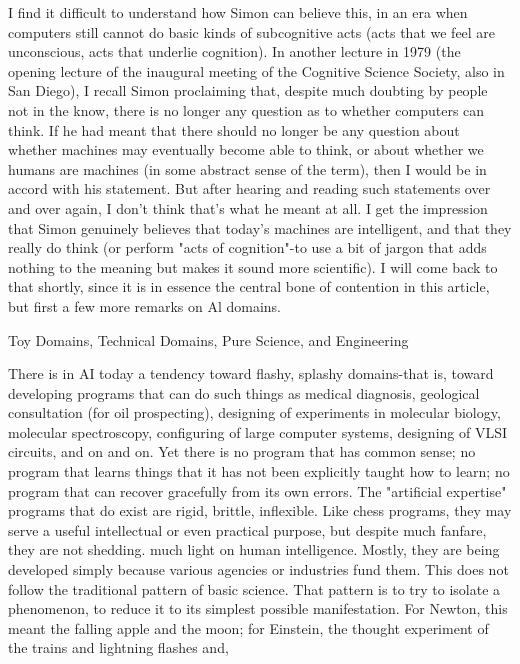 I find it difficult to understand how Simon can believe this, in an era when computers
still cannot do basic kinds of subcognitive acts (acts that we feel are unconscious, acts
that underlie cognition).
         In another lecture in 1979 (the opening lecture of the inaugural meeting of the
Cognitive Science Society, also in San Diego), I recall Simon proclaiming that,
despite much doubting by people not in the know, there is no longer any question as
to whether computers can think. If he had meant that there should no longer be any
question about whether machines may eventually become able to think, or about
whether we humans are machines (in some abstract sense of the term), then I would
be in accord with his statement. But after hearing and reading such statements over
and over again, I don't think that's what he meant at all. I get the impression that
Simon genuinely believes that today's machines are intelligent, and that they really do
think (or perform "acts of cognition"-to use a bit of jargon that adds nothing to the
meaning but makes it sound more scientific). I will come back to that shortly, since it
is in essence the central bone of contention in this article, but first a few more remarks
on Al domains.

                  Toy Domains, Technical Domains, Pure Science,
                                and Engineering

        There is in AI today a tendency toward flashy, splashy domains-that is, toward
developing programs that can do such things as medical diagnosis, geological
consultation (for oil prospecting), designing of experiments in molecular biology,
molecular spectroscopy, configuring of large computer systems, designing of VLSI
circuits, and on and on. Yet there is no program that has common sense; no program
that learns things that it has not been explicitly taught how to learn; no program that
can recover gracefully from its own errors. The "artificial expertise" programs that do
exist are rigid, brittle, inflexible. Like chess programs, they may serve a useful
intellectual or even practical purpose, but despite much fanfare, they are not shedding.
much light on human intelligence. Mostly, they are being developed simply because
various agencies or industries fund them.
        This does not follow the traditional pattern of basic science. That pattern is to
try to isolate a phenomenon, to reduce it to its simplest possible manifestation. For
Newton, this meant the falling apple and the moon; for Einstein, the thought
experiment of the trains and lightning flashes and,




